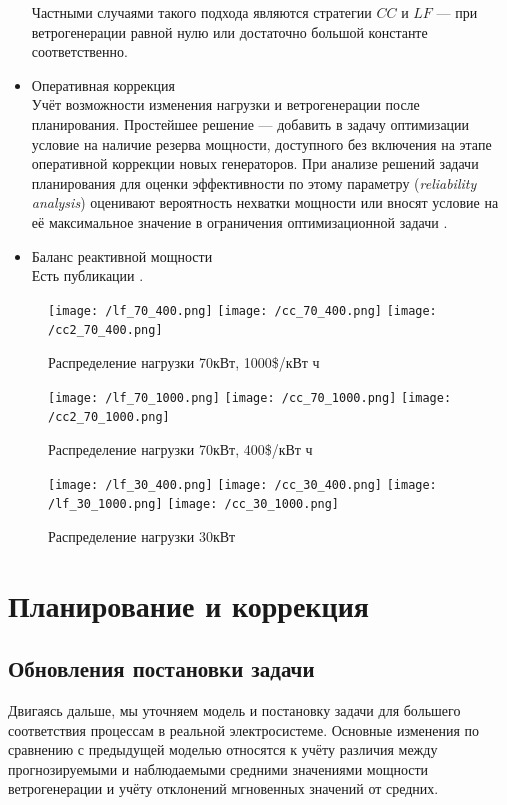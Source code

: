 \documentclass{report}
\begin{document}
\begin{itemize}
    Частными случаями такого подхода являются стратегии $CC$ и $LF$ --- при ветрогенерации равной нулю или достаточно большой константе соответственно.
    
    
    \item Оперативная коррекция\\
    Учёт возможности изменения нагрузки и ветрогенерации после планирования. 
    Простейшее решение --- добавить в задачу оптимизации условие на наличие резерва мощности, доступного без включения на этапе оперативной коррекции новых генераторов.
    При анализе решений задачи планирования для оценки эффективности по этому параметру (\textit{reliability analysis}) оценивают вероятность нехватки мощности \cite[8]{Sufyan2019} или вносят условие на её максимальное значение в ограничения оптимизационной задачи \cite[5]{Petersen2018}.
    
    \item Баланс реактивной мощности\\
    Есть публикации \cite{zhang2016reactive}.
    
\end{itemize}

\begin{figure}[]
\texttt{[image: /lf\_70\_400.png]}
\texttt{[image: /cc\_70\_400.png]}
\texttt{[image: /cc2\_70\_400.png]}
\centering
\caption{Распределение нагрузки 70кВт, 1000\$/кВт ч}
\label{fig:res_70_400}
\end{figure}

\begin{figure}[]
\texttt{[image: /lf\_70\_1000.png]}
\texttt{[image: /cc\_70\_1000.png]}
\texttt{[image: /cc2\_70\_1000.png]}
\caption{Распределение нагрузки 70кВт, 400\$/кВт ч}
\label{fig:res_70_1000}
\end{figure}

\begin{figure}[]
\texttt{[image: /lf\_30\_400.png]}
\texttt{[image: /cc\_30\_400.png]}
\texttt{[image: /lf\_30\_1000.png]}
\texttt{[image: /cc\_30\_1000.png]}
\caption{Распределение нагрузки 30кВт}
\label{fig:res_30}
\end{figure}


\chapter{Планирование и коррекция}
\section{Обновления постановки задачи}
    Двигаясь дальше, мы уточняем модель и постановку задачи для большего соответствия процессам в реальной электросистеме.
    Основные изменения по сравнению с предыдущей моделью относятся к учёту различия между прогнозируемыми и наблюдаемыми средними значениями мощности ветрогенерации и учёту отклонений мгновенных значений от средних. 
    
\end{document}
